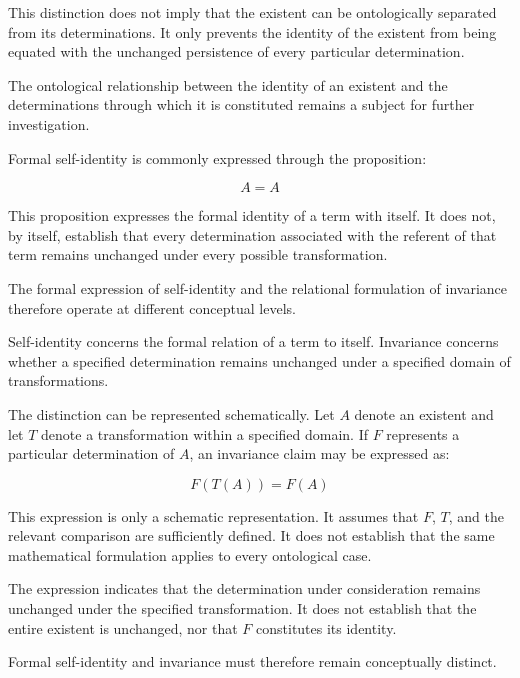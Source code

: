 This distinction does not imply that the existent
can be ontologically separated from its determinations.
It only prevents the identity of the existent from
being equated with the unchanged persistence of
every particular determination.

The ontological relationship between the identity
of an existent and the determinations through which
it is constituted remains a subject for further
investigation.


Formal self-identity is commonly expressed through
the proposition:

\[
A = A
\]

This proposition expresses the formal identity of
a term with itself. It does not, by itself, establish
that every determination associated with the referent
of that term remains unchanged under every possible
transformation.

The formal expression of self-identity and the
relational formulation of invariance therefore
operate at different conceptual levels.

Self-identity concerns the formal relation of a
term to itself. Invariance concerns whether a
specified determination remains unchanged under
a specified domain of transformations.

The distinction can be represented schematically.
Let \(A\) denote an existent and let \(T\) denote
a transformation within a specified domain.
If \(F\) represents a particular determination
of \(A\), an invariance claim may be expressed as:

\[
F(T(A)) = F(A)
\]

This expression is only a schematic representation.
It assumes that \(F\), \(T\), and the relevant
comparison are sufficiently defined. It does not
establish that the same mathematical formulation
applies to every ontological case.

The expression indicates that the determination
under consideration remains unchanged under the
specified transformation. It does not establish
that the entire existent is unchanged, nor that
\(F\) constitutes its identity.

Formal self-identity and invariance must therefore
remain conceptually distinct.


